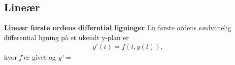 \subsection{Lineær}
\begin{defn}\textbf{Lineær første ordens differntial ligninger}\label{Def_Lineær_Første_Orndens_Differential_Ligninger}
 \newline
 En første ordens sædvanelig differential ligning på et ukendt y-plan er
 \begin{align}
     y'(t) = f(t,y(t)),
 \end{align}
 hvor \textit{f} er givet og \textit{y'} = 
\end{defn}